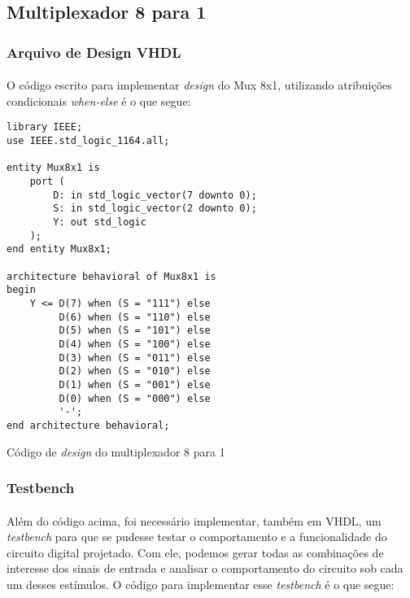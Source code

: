 \documentclass[a4paper,12pt]{article}
\newenvironment{code}{\captionsetup{type=listing}}{}
\begin{document}
\subsection{Multiplexador 8 para 1}

\subsubsection{Arquivo de Design VHDL}
\paragraph{}
O código escrito para implementar \textit{design} do Mux 8x1, utilizando atribuições condicionais \textit{when-else} é o que segue:

\begin{code}
\begin{verbatim}
library IEEE;
use IEEE.std_logic_1164.all;

entity Mux8x1 is
    port (
        D: in std_logic_vector(7 downto 0);
        S: in std_logic_vector(2 downto 0);
        Y: out std_logic
    );
end entity Mux8x1;

architecture behavioral of Mux8x1 is
begin
    Y <= D(7) when (S = "111") else
         D(6) when (S = "110") else
         D(5) when (S = "101") else
         D(4) when (S = "100") else
         D(3) when (S = "011") else
         D(2) when (S = "010") else
         D(1) when (S = "001") else
         D(0) when (S = "000") else
         '-';    
end architecture behavioral;
\end{verbatim}
\caption{Código de \textit{design} do multiplexador 8 para 1}
\end{code}

\subsubsection{Testbench}
\paragraph{}
Além do código acima, foi necessário implementar, também em VHDL, um \textit{testbench} para que se pudesse testar o comportamento e a funcionalidade do circuito digital projetado. Com ele, podemos gerar todas as combinações de interesse dos sinais de entrada e analisar o comportamento do circuito sob cada um desses estímulos. O código para implementar esse \textit{testbench} é o que segue:
\end{document}
